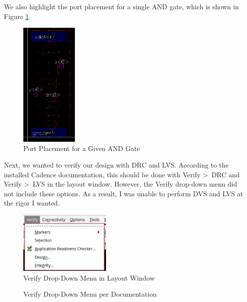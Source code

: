 \documentclass{article}
\begin{document}
	\noindent We also highlight the port placement for a single AND gate, which is shown in Figure \ref{fig::and2_1x_8_single_gate_ports}.
	
	\begin{figure}[H]
		\centerline{\includegraphics[width=0.25\textwidth]{and2_1x_8_single_gate_ports.png}}
		\caption{Port Placement for a Given AND Gate}
		\label{fig::and2_1x_8_single_gate_ports}
	\end{figure}
	
	\noindent Next, we wanted to verify our design with DRC and LVS. According to the installed Cadence documentation, this should be done with Verify \textgreater\ DRC and Verify \textgreater\ LVS in the layout window. However, the Verify drop-down menu did not include these options. As a result, I was unable to perform DVS and LVS at the rigor I wanted.
	
	\begin{figure}[H]
		\centerline{\includegraphics[width=0.4\textwidth]{verify_dropdown_menu.png}}
		\caption{Verify Drop-Down Menu in Layout Window}
		\label{fig::verify_dropdown_menu}
	\end{figure}
	
	\begin{figure}[H]
		\centerline{}
		\caption{Verify Drop-Down Menu per Documentation}
		\label{fig::verify_dropdown_menu_doc}
	\end{figure}
	
\end{document}
